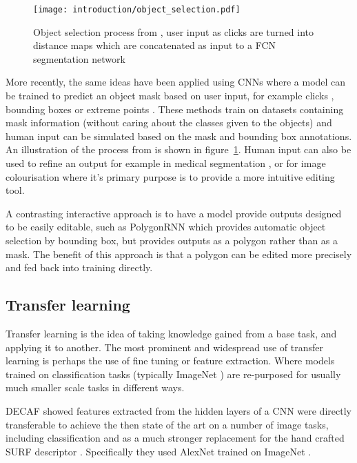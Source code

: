 \begin{figure}[h]
  \centering
  \texttt{[image: introduction/object\_selection.pdf]}
  \caption{Object selection process from \cite{Xu2016b}, user input as clicks are turned into distance maps which are concatenated as input to a \gls{FCN} segmentation network}  
  \label{fig:object_selection}
\end{figure}

More recently, the same ideas have been applied using \gls{CNN}s where a model can be trained to predict an object mask based on user input, for example clicks \cite{Xu2016b, Boroujerdi2017}, bounding boxes \cite {Xu2017} or extreme points \cite{Maninis2017}. These methods train on datasets containing mask information (without caring about the classes given to the objects) and human input can be simulated based on the mask and bounding box annotations. An illustration of the process from \cite{Xu2016b} is shown in figure~\ref{fig:object_selection}. Human input can also be used to refine an output for example in medical segmentation \cite{Wang2017}, or for image colourisation \cite{Zhang} where it's primary purpose is to provide a more intuitive editing tool.

A contrasting interactive approach is to have a model provide outputs designed to be easily editable, such as PolygonRNN \cite{Castrejon2017} which provides automatic object selection by bounding box, but provides outputs as a polygon rather than as a mask. The benefit of this approach is that a polygon can be edited more precisely and fed back into training directly.


\subsection {Transfer learning}

Transfer learning is the idea of taking knowledge gained from a base task, and applying it to another. The most prominent and widespread use of transfer learning is perhaps the use of fine tuning or feature extraction.  Where models trained on classification tasks (typically ImageNet \cite{JiaDeng2009}) are re-purposed for usually much smaller scale tasks in different ways. 

\gls{DECAF} \cite{Donahue2014} showed features extracted from the hidden layers of a \gls{CNN} were directly transferable to achieve the then state of the art on a number of image tasks, including classification and as a much stronger replacement for the hand crafted \gls{SURF} descriptor \cite{bay2006surf}.  Specifically they used AlexNet  \cite{Krizhevsky2012} trained on ImageNet \cite{JiaDeng2009}.

